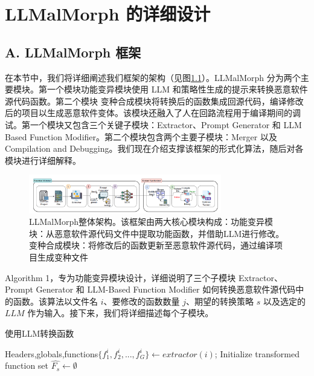 \chapter{LLMalMorph 的详细设计}

\section{A. LLMalMorph 框架}

在本节中，我们将详细阐述我们框架的架构（见图\ref{fig:4.1}）。LLMalMorph 分为两个主要模块。第一个模块功能变异模块使用 LLM 和策略性生成的提示来转换恶意软件源代码函数。第二个模块 变种合成模块将转换后的函数集成回源代码，编译修改后的项目以生成恶意软件变体。该模块还融入了人在回路流程用于编译期间的调试。第一个模块又包含三个关键子模块：Extractor、Prompt Generator 和 LLM Based Function Modifier。第二个模块包含两个主要子模块：Merger 以及 Compilation and Debugging。我们现在介绍支撑该框架的形式化算法，随后对各模块进行详细解释。

\begin{figure}[htbp]
	\centering
	\includegraphics[width=0.75\textwidth]{figures/figure1.png}
	\caption{LLMalMorph整体架构。该框架由两大核心模块构成：功能变异模块：从恶意软件源代码文件中提取功能函数，并借助LLM进行修改。变种合成模块：将修改后的函数更新至恶意软件源代码，通过编译项目生成变种文件}\label{fig:4.1}
\end{figure}

Algorithm 1，专为功能变异模块设计，详细说明了三个子模块 Extractor、Prompt Generator 和 LLM-Based Function Modifier 如何转换恶意软件源代码中的函数。该算法以文件名 $i$、要修改的函数数量 $j$、期望的转换策略 $s$ 以及选定的 $LLM$ 作为输入。接下来，我们将详细描述每个子模块。

\begin{algorithm}[htbp]
	\caption{使用LLM转换函数}

    Headers,globals,functions$\{f_{1}^{i},f_{2}^{i},...,f_{G}^{i}\}\leftarrow extractor(i)$;
    Initialize transformed function set $\hat{F_{s}}\leftarrow \emptyset$


\end{algorithm}